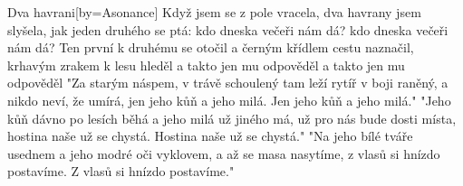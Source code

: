 \begin{song}{Dva havrani}[by={Asonance}]
\beginverse
Když jsem se z pole vracela,
dva havrany jsem slyšela,
jak jeden druhého se ptá:
kdo dneska večeři nám dá?
kdo dneska večeři nám dá?
\endverse
\beginverse
Ten první k druhému se otočil
a černým křídlem cestu naznačil,
krhavým zrakem k lesu hleděl
a takto jen mu odpověděl
a takto jen mu odpověděl
\endverse
\beginverse
"Za starým náspem, v trávě schoulený
tam leží rytíř v boji raněný,
a nikdo neví, že umírá,
jen jeho kůň a jeho milá.
Jen jeho kůň a jeho milá." 
\endverse
\beginverse
"Jeho kůň dávno po lesích běhá
a jeho milá už jiného má,
už pro nás bude dosti místa,
hostina naše už se chystá.
Hostina naše už se chystá."
\endverse
\beginverse
"Na jeho bílé tváře usednem
a jeho modré oči vyklovem,
a až se masa nasytíme,
z vlasů si hnízdo postavíme.
Z vlasů si hnízdo postavíme." 
\endverse
\end{song}
